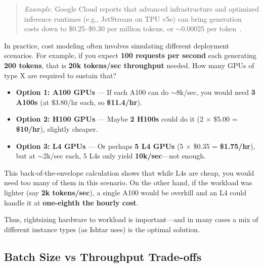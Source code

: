 \begin{quote}
\textit{Example.} Google Cloud reports that advanced infrastructure and optimized inference runtimes (e.g., JetStream on TPU v5e) can bring generation costs down to \$0.25–\$0.30 per million tokens, or $\sim$0.00025 per token~\cite{jouppi2023-tpuv4}.
\end{quote}

\begin{tcolorbox}[
  title={\textbf{Cost Modeling Example: Comparing GPU Options}},
  colback=orange!5,
  colframe=orange!40!black,
  colbacktitle=orange!20,
  coltitle=black,
  fonttitle=\bfseries,
  boxrule=0.7pt,
  arc=4pt,
  left=5mm, right=5mm, top=4mm, bottom=4mm,
  before skip=6pt,
  after skip=6pt,
  breakable
]
In practice, cost modeling often involves simulating different deployment scenarios. For example, if you expect \textbf{100 requests per second} each generating \textbf{200 tokens}, that is \textbf{20k tokens/sec throughput} needed. How many GPUs of type X are required to sustain that?

\begin{itemize}[leftmargin=1.5em, itemsep=4pt]
    \item \textbf{Option 1: A100 GPUs} — If each A100 can do $\sim$8k/sec, you would need \textbf{3 A100s} (at \$3.80/hr each, so \textbf{\$11.4/hr}).
    \item \textbf{Option 2: H100 GPUs} — Maybe \textbf{2 H100s} could do it (2 $\times$ \$5.00 = \textbf{\$10/hr}), slightly cheaper.
    \item \textbf{Option 3: L4 GPUs} — Or perhaps \textbf{5 L4 GPUs} (5 $\times$ \$0.35 = \textbf{\$1.75/hr}), but at $\sim$2k/sec each, 5 L4s only yield \textbf{10k/sec}---not enough.
\end{itemize}

This back-of-the-envelope calculation shows that while L4s are cheap, you would need too many of them in this scenario. On the other hand, if the workload was lighter (say \textbf{2k tokens/sec}), a single A100 would be overkill and an L4 could handle it at \textbf{one-eighth the hourly cost}.
\end{tcolorbox}

Thus, rightsizing hardware to workload is important---and in many cases a mix of different instance types (as Ishtar uses) is the optimal solution.

\subsection{Batch Size vs Throughput Trade-offs}
\label{sec:infra-cost-batch}

